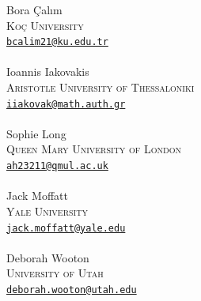 \documentclass[letterpaper, 12pt]{article}
\theoremstyle{plain}
\theoremstyle{definition}
\theoremstyle{plain}
\theoremstyle{plain}
\numberwithin{equation}{section}
\newcommand{\1}{\textbf{1}}
\begin{document}
\bigskip
\footnotesize
\noindent
Bora \c{C}al{\i}m\\
\textsc{Ko\c{c} University}\\
\href{mailto:bcalim21@ku.edu.tr}
{\texttt{bcalim21@ku.edu.tr}}
\\ \\
Ioannis Iakovakis\\
\textsc{Aristotle University of Thessaloniki}\\
\href{mailto:iiakovak@math.auth.gr}
{\texttt{iiakovak@math.auth.gr}}
\\ \\
Sophie Long\\
\textsc{Queen Mary University of London}\\
\href{mailto:ah23211@qmul.ac.uk}
{\texttt{ah23211@qmul.ac.uk}}
\\ \\
Jack Moffatt\\
\textsc{Yale University}\\
\href{mailto:jack.moffatt@yale.edu}
{\texttt{jack.moffatt@yale.edu}}
\\ \\
Deborah Wooton\\
\textsc{University of Utah}\\
\href{mailto:deborah.wooton@utah.edu}
{\texttt{deborah.wooton@utah.edu}}
\end{document}
